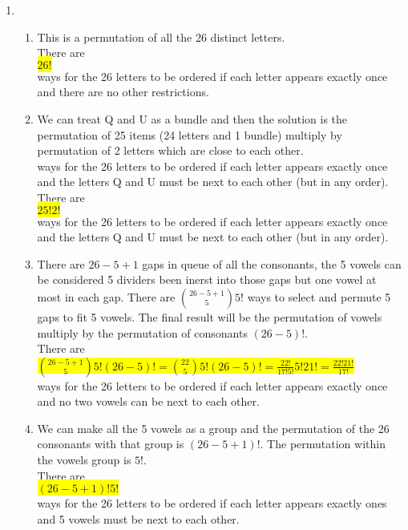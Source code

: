 \documentclass{article}
\begin{document}
\begin{enumerate}
\begin{enumerate}
	\end{enumerate}
	
	\item
	\begin{enumerate}
		
		\item 
		\mysolu
		This is a permutation of all the 26 distinct letters.\\
		\myansw
		There are\\
		\colorbox{yellow}{
			${26!}$
		}\\
		ways for the 26 letters to be ordered if each letter appears exactly once and there are no other restrictions.\\
		
		\item
		\mysolu
		We can treat Q and U as a bundle and then the solution is the permutation of 25 items (24 letters and 1 bundle) multiply by permutation of 2 letters which are close to each other.\\
		ways for the 26 letters to be ordered if each letter appears exactly once and the letters Q and U must be next to each other (but in any order).\\
				\myansw
		There are\\
		\colorbox{yellow}{
			${25!2!}$
		}\\
		ways for the 26 letters to be ordered if each letter appears exactly once and the letters Q and U must be next to each other (but in any order).\\
		
		
		\item
		\mysolu
		There are ${26-5+1}$ gaps in queue of all the consonants, the 5 vowels can be considered 5 dividers been inerst into those gaps but one vowel at most in each gap. There are ${{26-5+1 \choose 5}5!}$ ways to select and permute 5 gaps to fit 5 vowels. The final result will be the permutation of vowels multiply by the permutation of consonants ${(26-5)!}$. \\
		\myansw
		There are\\
		\colorbox{yellow}{
			${{26-5+1 \choose 5}5!(26-5)! ={22 \choose 5}5!(26-5)! = \frac{22!}{17!5!}5!21! = \frac{22!21!}{17!}}$
		}\\
		ways for the 26 letters to be ordered if each letter appears exactly once and no two vowels can be next to each other.\\
		
		\item
		\mysolu
		We can make all the 5 vowels as a group and the permutation of the 26 consonants with that group is ${{(26-5+1)!}}$. The permutation within the vowels group is ${5!}$.\\
		\myansw
		There are\\
		\colorbox{yellow}{
			${(26-5+1)!5!}$
		}\\
		ways for the 26 letters to be ordered if each letter appears exactly ones and 5 vowels must be next to each other. 
		

\end{enumerate}
\end{enumerate}
\end{document}
